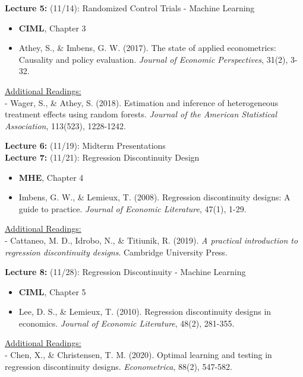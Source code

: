 \documentclass[12pt]{article}
\begin{document}
\vspace{2em}
\noindent\textbf{Lecture 5:} (11/14): Randomized Control Trials - Machine Learning \\
\vspace{1em}
\begin{itemize}
    \item \textbf{CIML}, Chapter 3
    \item Athey, S., \& Imbens, G. W. (2017). The state of applied econometrics: Causality and policy evaluation. \textit{Journal of Economic Perspectives}, 31(2), 3-32.
\end{itemize}
\vspace{1em}
\underline{Additional Readings:} \\
\hspace{1em} - Wager, S., \& Athey, S. (2018). Estimation and inference of heterogeneous treatment effects using random forests. \textit{Journal of the American Statistical Association}, 113(523), 1228-1242.

\vspace{2em}
\noindent\textbf{Lecture 6:} (11/19): Midterm Presentations \\

\vspace{2em}
\noindent\textbf{Lecture 7:} (11/21): Regression Discontinuity Design \\
\vspace{1em}
\begin{itemize}
    \item \textbf{MHE}, Chapter 4
    \item Imbens, G. W., \& Lemieux, T. (2008). Regression discontinuity designs: A guide to practice. \textit{Journal of Economic Literature}, 47(1), 1-29.
\end{itemize}
\vspace{1em}
\underline{Additional Readings:} \\
\hspace{1em} - Cattaneo, M. D., Idrobo, N., \& Titiunik, R. (2019). \textit{A practical introduction to regression discontinuity designs}. Cambridge University Press.

\vspace{2em}
\noindent\textbf{Lecture 8:} (11/28): Regression Discontinuity - Machine Learning \\
\vspace{1em}
\begin{itemize}
    \item \textbf{CIML}, Chapter 5
    \item Lee, D. S., \& Lemieux, T. (2010). Regression discontinuity designs in economics. \textit{Journal of Economic Literature}, 48(2), 281-355.
\end{itemize}
\vspace{1em}
\underline{Additional Readings:} \\
\hspace{1em} - Chen, X., \& Christensen, T. M. (2020). Optimal learning and testing in regression discontinuity designs. \textit{Econometrica}, 88(2), 547-582.
\end{document}

